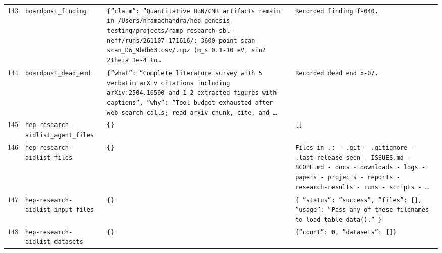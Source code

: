 \documentclass[11pt,a4paper]{article}
\begin{document}
\begin{longtable}{@{}p{}p{}p{}p{}@{}}
143 & \texttt{board}\newline\texttt{post\_\allowbreak{}finding} & \texttt{\{''claim'':\allowbreak{} ''Quantitative BBN/\allowbreak{}CMB artifacts remain in /\allowbreak{}Users/\allowbreak{}nramachandra/\allowbreak{}hep-genesis-testing/\allowbreak{}projects/\allowbreak{}ramp-research-sbl-neff/\allowbreak{}runs/\allowbreak{}261107\_\allowbreak{}171616/\allowbreak{}:\allowbreak{} 3600-point scan scan\_\allowbreak{}DW\_\allowbreak{}9bdb63.csv/\allowbreak{}.npz (m\_\allowbreak{}s 0.1-10 eV,\allowbreak{} sin2 2theta 1e-4 to\ldots{}\allowbreak{}} & \texttt{Recorded finding f-040.} \\
144 & \texttt{board}\newline\texttt{post\_\allowbreak{}dead\_\allowbreak{}end} & \texttt{\{''what'':\allowbreak{} ''Complete literature survey with 5 verbatim arXiv citations including arXiv:\allowbreak{}2504.16590 and 1-2 extracted figures with captions'',\allowbreak{} ''why'':\allowbreak{} ''Tool budget exhausted after web\_\allowbreak{}search calls;\allowbreak{} read\_\allowbreak{}arxiv\_\allowbreak{}chunk,\allowbreak{} cite,\allowbreak{} and \ldots{}\allowbreak{}} & \texttt{Recorded dead end x-07.} \\
145 & \texttt{hep-research-aid}\newline\texttt{list\_\allowbreak{}agent\_\allowbreak{}files} & \texttt{\{\}\allowbreak{}} & \texttt{[]\allowbreak{}} \\
146 & \texttt{hep-research-aid}\newline\texttt{list\_\allowbreak{}files} & \texttt{\{\}\allowbreak{}} & \texttt{Files in .:\allowbreak{}   - .git   - .gitignore   - .last-release-seen   - ISSUES.md   - SCOPE.md   - docs   - downloads   - logs   - papers   - projects   - reports   - research-results   - runs   - scripts   - \ldots{}\allowbreak{}} \\
147 & \texttt{hep-research-aid}\newline\texttt{list\_\allowbreak{}input\_\allowbreak{}files} & \texttt{\{\}\allowbreak{}} & \texttt{\{   ''status'':\allowbreak{} ''success'',\allowbreak{}   ''files'':\allowbreak{} []\allowbreak{},\allowbreak{}   ''usage'':\allowbreak{} ''Pass any of these filenames to load\_\allowbreak{}table\_\allowbreak{}data()\allowbreak{}.'' \}\allowbreak{}} \\
148 & \texttt{hep-research-aid}\newline\texttt{list\_\allowbreak{}datasets} & \texttt{\{\}\allowbreak{}} & \texttt{\{''count'':\allowbreak{} 0,\allowbreak{} ''datasets'':\allowbreak{} []\allowbreak{}\}\allowbreak{}} \\

\end{longtable}
\end{document}
